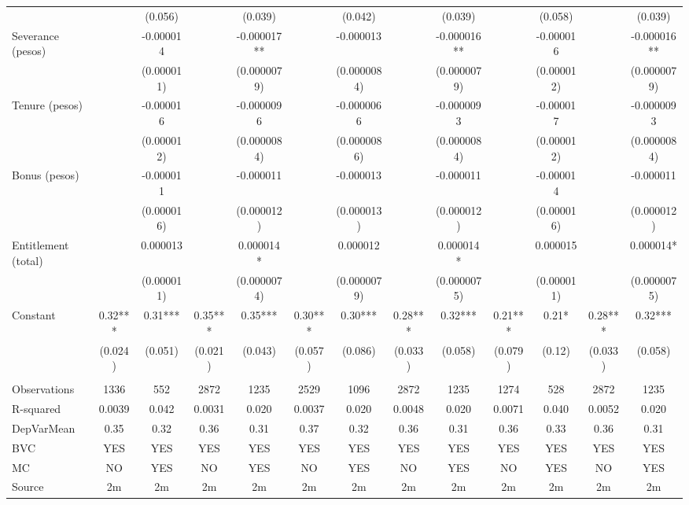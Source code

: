 \begin{tabular}{lcccccccccccc}
      &       & (0.056) &       & (0.039) &       & (0.042) &       & (0.039) &       & (0.058) &       & (0.039) \\
Severance (pesos) &       & -0.000014 &       & -0.000017** &       & -0.000013 &       & -0.000016** &       & -0.000016 &       & -0.000016** \\
      &       & (0.000011) &       & (0.0000079) &       & (0.0000084) &       & (0.0000079) &       & (0.000012) &       & (0.0000079) \\
Tenure (pesos) &       & -0.000016 &       & -0.0000096 &       & -0.0000066 &       & -0.0000093 &       & -0.000017 &       & -0.0000093 \\
      &       & (0.000012) &       & (0.0000084) &       & (0.0000086) &       & (0.0000084) &       & (0.000012) &       & (0.0000084) \\
Bonus (pesos) &       & -0.000011 &       & -0.000011 &       & -0.000013 &       & -0.000011 &       & -0.000014 &       & -0.000011 \\
      &       & (0.000016) &       & (0.000012) &       & (0.000013) &       & (0.000012) &       & (0.000016) &       & (0.000012) \\
Entitlement (total) &       & 0.000013 &       & 0.000014* &       & 0.000012 &       & 0.000014* &       & 0.000015 &       & 0.000014* \\
      &       & (0.000011) &       & (0.0000074) &       & (0.0000079) &       & (0.0000075) &       & (0.000011) &       & (0.0000075) \\
Constant & 0.32*** & 0.31*** & 0.35*** & 0.35*** & 0.30*** & 0.30*** & 0.28*** & 0.32*** & 0.21*** & 0.21* & 0.28*** & 0.32*** \\
      & (0.024) & (0.051) & (0.021) & (0.043) & (0.057) & (0.086) & (0.033) & (0.058) & (0.079) & (0.12) & (0.033) & (0.058) \\
      &       &       &       &       &       &       &       &       &       &       &       &  \\
\midrule
Observations & 1336  & 552   & 2872  & 1235  & 2529  & 1096  & 2872  & 1235  & 1274  & 528   & 2872  & 1235 \\
R-squared & 0.0039 & 0.042 & 0.0031 & 0.020 & 0.0037 & 0.020 & 0.0048 & 0.020 & 0.0071 & 0.040 & 0.0052 & 0.020 \\
DepVarMean & 0.35  & 0.32  & 0.36  & 0.31  & 0.37  & 0.32  & 0.36  & 0.31  & 0.36  & 0.33  & 0.36  & 0.31 \\
BVC   & YES   & YES   & YES   & YES   & YES   & YES   & YES   & YES   & YES   & YES   & YES   & YES \\
MC    & NO    & YES   & NO    & YES   & NO    & YES   & NO    & YES   & NO    & YES   & NO    & YES \\
Source & 2m    & 2m    & 2m    & 2m    & 2m    & 2m    & 2m    & 2m    & 2m    & 2m    & 2m    & 2m \\
\bottomrule
\bottomrule
\end{tabular}%
